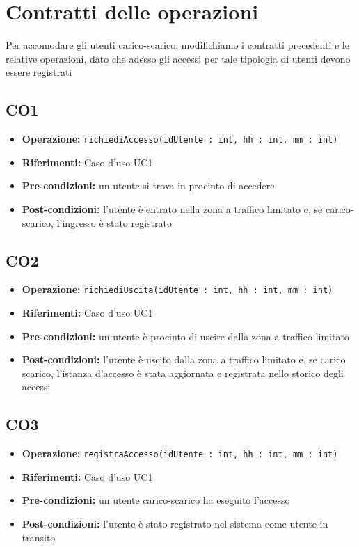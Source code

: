 \documentclass[12pt, letterpaper]{article}
\begin{document}
\section{Contratti delle operazioni}
Per accomodare gli utenti carico-scarico, modifichiamo
i contratti precedenti e le relative operazioni, dato 
che adesso gli accessi per tale tipologia di utenti devono
essere registrati

\subsection{CO1}
\begin{itemize}
    \item \textbf{Operazione:} \texttt{richiediAccesso(idUtente : int, hh : int, mm : int)}
    \item \textbf{Riferimenti:} Caso d'uso UC1
    \item \textbf{Pre-condizioni:} un utente 
    si trova in procinto di accedere
    \item \textbf{Post-condizioni:} l'utente 
    è entrato nella zona a traffico limitato
    e, se carico-scarico, l'ingresso è stato 
    registrato
\end{itemize}

\subsection{CO2}
\begin{itemize}
    \item \textbf{Operazione:} \texttt{richiediUscita(idUtente : int, hh : int, mm : int)}
    \item \textbf{Riferimenti:} Caso d'uso UC1
    \item \textbf{Pre-condizioni:} un utente 
    è procinto di uscire dalla zona a traffico limitato
    \item \textbf{Post-condizioni:} l'utente 
    è uscito dalla zona a traffico limitato e,
    se carico scarico, l'istanza d'accesso è stata 
    aggiornata e registrata nello storico degli 
    accessi
\end{itemize}

\subsection{CO3}
\begin{itemize}
    \item \textbf{Operazione:} \texttt{registraAccesso(idUtente : int, hh : int, mm : int)}
    \item \textbf{Riferimenti:} Caso d'uso UC1
    \item \textbf{Pre-condizioni:} un utente 
    carico-scarico ha eseguito l'accesso
    \item \textbf{Post-condizioni:} l'utente 
    è stato registrato nel sistema come utente 
    in transito
\end{itemize}
\end{document}
